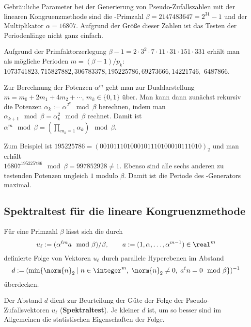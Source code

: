 \linie

Gebräuliche Parameter bei der Generierung von Pseudo-Zufallszahlen mit der
linearen Kongruenzmethode sind die -Primzahl
$\beta = 2147483647 = 2^{31} - 1$ und der Multiplikator $\alpha = 16807$.
Aufgrund der Größe dieser Zahlen ist das Testen der Periodenlänge
nicht ganz einfach.

Aufgrund der Primfaktorzerlegung
$\beta - 1 = 2 \cdot 3^2 \cdot 7 \cdot 11 \cdot 31 \cdot 151 \cdot 331$
erhält man als mögliche Perioden $m = (\beta - 1)/p_k$:
$1073741823, 715827882, 306783378, 195225786, 69273666, 14221746,$
$6487866$.

Zur Berechnung der Potenzen $\alpha^m$ geht man zur Dualdarstellung
$m = m_0 + 2m_1 + 4m_2 + \dotsb$, $m_k \in \{0, 1\}$ über.
Man kann dann zunächst rekursiv die Potenzen
$\alpha_k := \alpha^{2^k} \mod \beta$ berechnen, indem man
$\alpha_{k+1} \mod \beta = \alpha_k^2 \mod \beta$ rechnet.
Damit ist
$\alpha^m \mod \beta = (\prod_{m_k=1} \alpha_k) \mod \beta$.

Zum Beispiel ist $195225786 = (001011101000101110100010111010)_2$
und man erhält \\
$16807^{195225786} \mod \beta = 997852928 \not= 1$.
Ebenso sind alle sechs anderen zu testenden Potenzen ungleich $1$ modulo
$\beta$.
Damit ist die Periode des -Generators maximal.

\pagebreak

\subsection{%
    Spektraltest für die lineare Kongruenzmethode%
}

Für eine Primzahl $\beta$ lässt sich die durch
\begin{align*}
    u_\ell := (\alpha^{\ell m} a \mod \beta) / \beta, \qquad
    a := (1, \alpha, \dotsc, \alpha^{m-1}) \in \real^m
\end{align*}
definierte Folge von Vektoren $u_\ell$ durch parallele Hyperebenen im Abstand
\begin{align*}
    d := (\min\{\norm{n}_2 \;|\; n \in \integer^m,\; \norm{n}_2 \not= 0,\;
    a^t n = 0 \mod \beta\})^{-1}
\end{align*}
überdecken.

Der Abstand $d$ dient zur Beurteilung der Güte der Folge der
Pseudo-Zufallsvektoren $u_\ell$ (\textbf{Spektraltest}).
Je kleiner $d$ ist, um so besser sind im Allgemeinen die statistischen
Eigenschaften der Folge.


